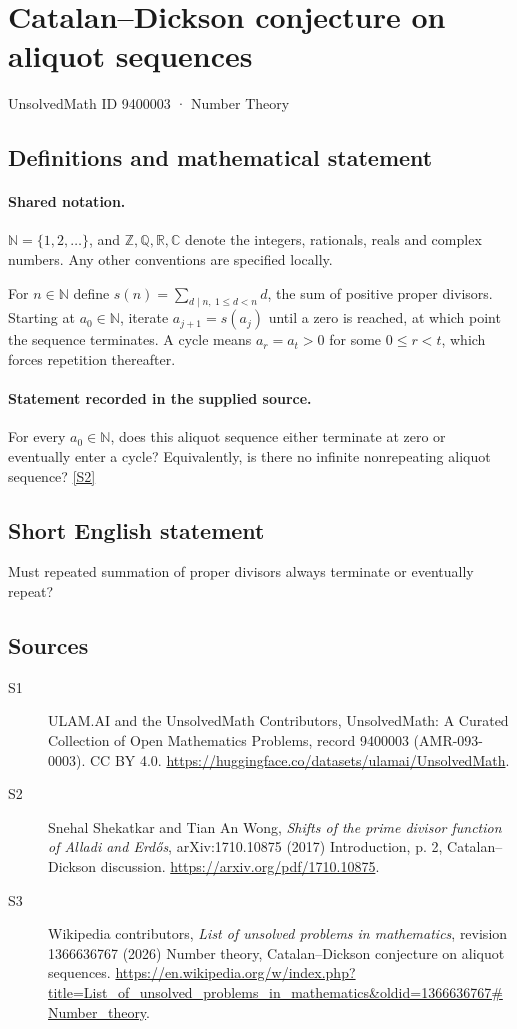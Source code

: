 \documentclass[11pt]{article}
\newcommand{\sref}[2]{\hyperlink{source:#1:#2}{[S#2]}}
\begin{document}
\setcounter{section}{9400002}
\section{Catalan–Dickson conjecture on aliquot sequences}\label{9400003}
{\small\sffamily UnsolvedMath ID 9400003 · Number Theory}
\subsection{Definitions and mathematical statement}

\paragraph{Shared notation.}$\mathbb N=\{1,2,\ldots\}$, and $\mathbb Z,\mathbb Q,\mathbb R,\mathbb C$ denote the integers, rationals, reals and complex numbers. Any other conventions are specified locally.


For $n\in\mathbb N$ define $s(n)=\sum_{d\mid n,\ 1\le d<n}d$, the sum of positive proper divisors. Starting at $a_0\in\mathbb N$, iterate $a_{j+1}=s(a_j)$ until a zero is reached, at which point the sequence terminates. A cycle means $a_r=a_t>0$ for some $0\le r<t$, which forces repetition thereafter.
\paragraph{Statement recorded in the supplied source.}
For every $a_0\in\mathbb N$, does this aliquot sequence either terminate at zero or eventually enter a cycle? Equivalently, is there no infinite nonrepeating aliquot sequence? \sref{9400003}{2}
\subsection{Short English statement}
Must repeated summation of proper divisors always terminate or eventually repeat?
\subsection{Sources}
\begin{description}
\item[\hypertarget{source:9400003:1}{S1}] ULAM.AI and the UnsolvedMath Contributors, UnsolvedMath: A Curated Collection of Open Mathematics Problems, record 9400003 (AMR-093-0003). CC BY 4.0. \url{https://huggingface.co/datasets/ulamai/UnsolvedMath}.
\item[\hypertarget{source:9400003:2}{S2}] Snehal Shekatkar and Tian An Wong, \emph{Shifts of the prime divisor function of Alladi and Erd\H{o}s}, arXiv:1710.10875 (2017) Introduction, p. 2, Catalan--Dickson discussion. \url{https://arxiv.org/pdf/1710.10875}.
\item[\hypertarget{source:9400003:3}{S3}] Wikipedia contributors, \emph{List of unsolved problems in mathematics}, revision 1366636767 (2026) Number theory, Catalan–Dickson conjecture on aliquot sequences. \url{https://en.wikipedia.org/w/index.php?title=List_of_unsolved_problems_in_mathematics&oldid=1366636767#Number_theory}.
\end{description}
\label{end:9400003}
\end{document}
